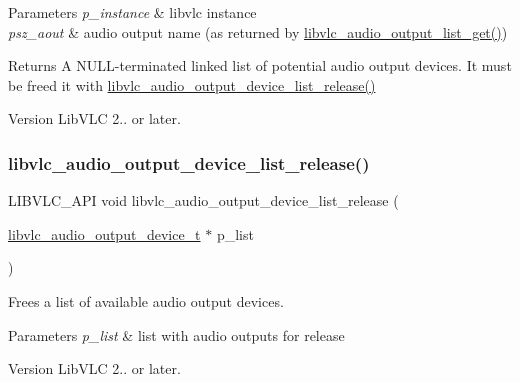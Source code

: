 \begin{DoxyParams}{Parameters}
{\em p\+\_\+instance} & libvlc instance \\
\hline
{\em psz\+\_\+aout} & audio output name (as returned by \hyperlink{group__libvlc__audio_gabdb1104576d289121beb13cb4def720f}{libvlc\+\_\+audio\+\_\+output\+\_\+list\+\_\+get()}) \\
\hline
\end{DoxyParams}
\begin{DoxyReturn}{Returns}
A N\+U\+L\+L-\/terminated linked list of potential audio output devices. It must be freed it with \hyperlink{group__libvlc__audio_gae96430562ae07bfba7d0e841391be8b3}{libvlc\+\_\+audio\+\_\+output\+\_\+device\+\_\+list\+\_\+release()} 
\end{DoxyReturn}
\begin{DoxyVersion}{Version}
Lib\+V\+LC 2.. or later. 
\end{DoxyVersion}
\mbox{\label{group__libvlc__audio_gae96430562ae07bfba7d0e841391be8b3}} 
\subsubsection{\texorpdfstring{libvlc\+\_\+audio\+\_\+output\+\_\+device\+\_\+list\+\_\+release()}{libvlc\_audio\_output\_device\_list\_release()}}
{\footnotesize\ttfamily L\+I\+B\+V\+L\+C\+\_\+\+A\+PI void libvlc\+\_\+audio\+\_\+output\+\_\+device\+\_\+list\+\_\+release (\begin{DoxyParamCaption}\item[{\hyperlink{structlibvlc__audio__output__device__t}{libvlc\+\_\+audio\+\_\+output\+\_\+device\+\_\+t} $\ast$}]{p\+\_\+list }\end{DoxyParamCaption})}

Frees a list of available audio output devices.


\begin{DoxyParams}{Parameters}
{\em p\+\_\+list} & list with audio outputs for release \\
\hline
\end{DoxyParams}
\begin{DoxyVersion}{Version}
Lib\+V\+LC 2.. or later. 
\end{DoxyVersion}
\mbox{\label{group__libvlc__audio_gac5da6f9bf242c2c11fd2ea69e316fddb}} 
